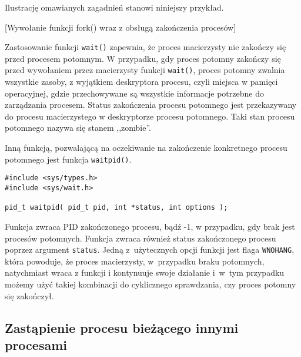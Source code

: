 Ilustrację omawianych zagadnień stanowi niniejszy przykład.

\begin{example}{[Wywołanie funkcji fork() wraz z obsługą zakończenia procesów]}
  \label{ex:11SSB}
  
\end{example}


Zastosowanie funkcji \texttt{wait()} zapewnia, że proces macierzysty nie zakończy się
przed procesem potomnym. W przypadku, gdy proces potomny zakończy się przed
wywołaniem przez macierzysty funkcji \texttt{wait()}, proces potomny zwalnia
wszystkie zasoby, z wyjątkiem deskryptora procesu, czyli miejsca w pamięci
operacyjnej, gdzie przechowywane są wszystkie informacje potrzebne do
zarządzania procesem. Status zakończenia procesu potomnego jest przekazywany do
procesu macierzystego w deskryptorze procesu potomnego. Taki stan procesu
potomnego nazywa się stanem ,,zombie''.

Inną funkcją, pozwalającą na oczekiwanie na zakończenie konkretnego procesu
potomnego jest funkcja \texttt{waitpid()}.

\begin{lstlisting}[style=MyCStyle]
#include <sys/types.h>
#include <sys/wait.h>

pid_t waitpid( pid_t pid, int *status, int options );
\end{lstlisting}

Funkcja zwraca PID zakończonego procesu, bądź -1, w przypadku, gdy brak jest
procesów potomnych. Funkcja zwraca również status zakończonego procesu poprzez
argument \texttt{status}. Jedną z użytecznych opcji funkcji jest flaga
\texttt{WNOHANG}, która powoduje, że proces macierzysty, w przypadku braku
potomnych, natychmiast wraca z funkcji i kontynuuje swoje działanie i w tym
przypadku możemy użyć takiej kombinacji do cyklicznego sprawdzania, czy proces
potomny się zakończył.


\subsection{Zastąpienie procesu bieżącego innymi procesami}

